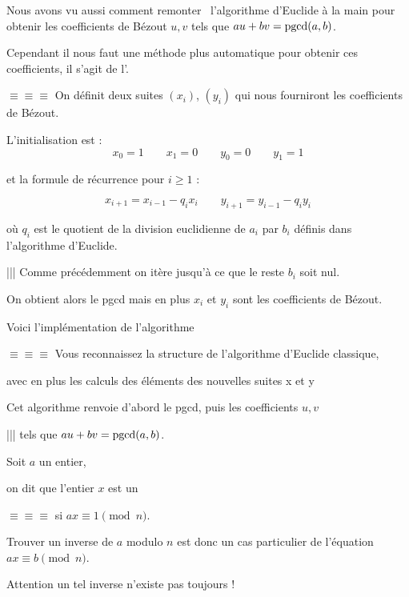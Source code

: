 \diapo


Nous avons vu aussi comment \og remonter \fg\ l'algorithme d'Euclide à la main pour
obtenir les coefficients de Bézout $u,v$ tels que $au+bv=\mathop{\mathrm{pgcd}}\nolimits(a,b)$.


Cependant il nous faut une méthode plus automatique pour obtenir ces coefficients, il s'agit de 
l'.

\change

$\equiv \equiv \equiv $
On définit deux suites $(x_i)$, $(y_i)$ qui nous fourniront les coefficients de Bézout.

L'initialisation est :
$$x_0=1 \qquad  x_1=0 \qquad y_0=0 \qquad y_1 = 1$$

et la formule de récurrence pour $i\geq 1$ :

$$x_{i+1} = x_{i-1} - q_i x_i \qquad y_{i+1} = y_{i-1} - q_i y_i$$

où $q_i$ est le quotient de la division euclidienne de $a_i$ par $b_i$ définis dans l'algorithme d'Euclide.
 
 
|||
Comme précédemment on itère jusqu'à ce que le reste $b_i$ soit nul.

On obtient alors le pgcd mais en plus $x_i$ et $y_i$ sont les coefficients de Bézout.

\change

Voici l'implémentation de l'algorithme
 
$\equiv \equiv \equiv $
Vous reconnaissez la structure de l'algorithme d'Euclide classique,

avec en plus les calculs des éléments des nouvelles suites x et y 

Cet algorithme renvoie d'abord le pgcd, puis les coefficients $u,v$ 

|||
tels que $au+bv = \mathop{\mathrm{pgcd}}\nolimits(a,b)$.




\diapo


Soit $a$ un entier, 


on dit que l'entier $x$ est un 

$\equiv \equiv \equiv $
si $ax \equiv 1 \pmod{n}$.



Trouver un inverse de $a$ modulo $n$ est donc 
un cas particulier de l'équation $ax \equiv b \pmod n$.

Attention un tel inverse n'existe pas toujours !

